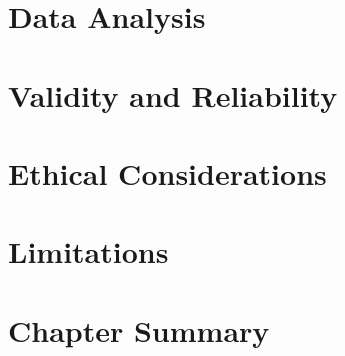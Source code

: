 \section{Data Analysis}

\section{Validity and Reliability}

\section{Ethical Considerations}

\section{Limitations}

\section{Chapter Summary}
